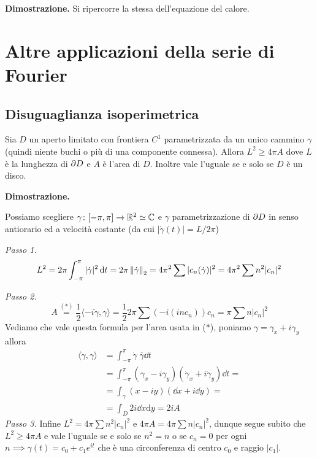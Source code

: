 \textbf{Dimostrazione.}
Si ripercorre la stessa dell'equazione del calore.


\section{Altre applicazioni della serie di Fourier}

\subsection{Disuguaglianza isoperimetrica}

Sia $D$ un aperto limitato con frontiera $C^1$ parametrizzata da un unico cammino $\gamma$ (quindi niente buchi o più di una componente connessa). Allora $L^2 \geq 4 \pi A$ dove $L$ è la lunghezza di $\partial D$ e $A$ è l'area di $D$. Inoltre vale l'uguale se e solo se $D$ è un disco.

\textbf{Dimostrazione.}

Possiamo scegliere $\gamma \colon [-\pi, \pi] \to \mathbb R^2 \simeq \mathbb C$ e $\gamma$ parametrizzazione di $\partial D$ in senso antiorario ed a velocità costante (da cui $|\dot\gamma(t)| = L / 2\pi$)

\textit{Passo 1.}
$$
L^2 = 2\pi \int_{-\pi}^\pi |\dot \gamma|^2 \,\mathrm{d} t = 2\pi \left\lVert \dot \gamma \right\rVert_2 = 4 \pi^2 \sum |c_n(\dot \gamma)|^2 = 4 \pi^2 \sum n^2 |c_n|^2
$$

\textit{Passo 2.}
$$
A \overset{(*)}{=} \frac{1}{2}\langle -i\dot\gamma, \gamma \rangle = \frac{1}{2} 2\pi \sum (-i (inc_n))c_n = \pi \sum n |c_n|^2
$$
Vediamo che vale questa formula per l'area usata in ($*$), poniamo $\gamma = \gamma_x + i \gamma_y$ allora
$$
\begin{aligned}
	\langle \dot\gamma, \gamma \rangle 
	&= \int_{-\pi}^\pi \dot\gamma \; \overline\gamma \dd t \\
	&= \int_{-\pi}^\pi (\gamma_x - i \gamma_y) (\dot\gamma_x + i \dot\gamma_y) \dd t = \\
	&= \int_\gamma (x - iy) (\dd x + i \dd y) = \\
	&= \int_D 2i \dd x \mathrm d y = 2i A
\end{aligned}
$$
\textit{Passo 3.}
Infine $L^2 = 4 \pi \sum n^2 |c_n|^2$ e $4\pi A = 4\pi \sum n |c_n|^2$, dunque segue subito che $L^2 \geq 4 \pi A$ e vale l'uguale se e solo se $n^2 = n$ o se $c_n = 0$ per ogni $n \implies \gamma(t) = c_0 + c_1 e^{it}$ che è una circonferenza di centro $c_0$ e raggio $|c_1|$.




